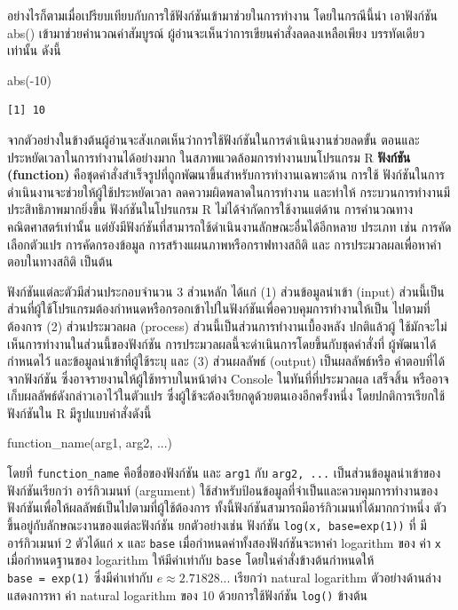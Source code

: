 \documentclass[
  a4paper,
]{book}
\newenvironment{Shaded}{\begin{snugshade}}{\end{snugshade}}
\newcommand{\DecValTok}[1]{\textcolor[rgb]{0.68,0.00,0.00}{#1}}
\newcommand{\FunctionTok}[1]{\textcolor[rgb]{0.28,0.35,0.67}{#1}}
\newcommand{\NormalTok}[1]{\textcolor[rgb]{0.00,0.23,0.31}{#1}}
\newcommand{\SpecialCharTok}[1]{\textcolor[rgb]{0.37,0.37,0.37}{#1}}
\begin{document}
อย่างไรก็ตามเมื่อเปรียบเทียบกับการใช้ฟังก์ชันเข้ามาช่วยในการทำงาน โดยในกรณีนี้นำ
เอาฟังก์ชัน abs() เข้ามาช่วยคำนวณค่าสัมบูรณ์ ผู้อ่านจะเห็นว่าการเขียนคำสั่งลดลงเหลือเพียง
บรรทัดเดียวเท่านั้น ดังนี้

\begin{Shaded}
\begin{Highlighting}[]
\FunctionTok{abs}\NormalTok{(}\SpecialCharTok{{-}}\DecValTok{10}\NormalTok{)}
\end{Highlighting}
\end{Shaded}

\begin{verbatim}
[1] 10
\end{verbatim}

จากตัวอย่างในข้างต้นผู้อ่านจะสังเกตเห็นว่าการใช้ฟังก์ชันในการดำเนินงานช่วยลดขั้น
ตอนและประหยัดเวลาในการทำงานได้อย่างมาก ในสภาพแวดล้อมการทำงานบนโปรแกรม R
\textbf{ฟังก์ชัน (function)} คือชุดคำสั่งสำเร็จรูปที่ถูกพัฒนาขึ้นสำหรับการทำงานเฉพาะด้าน
การใช้ ฟังก์ชันในการดำเนินงานจะช่วยให้ผู้ใช้ประหยัดเวลา ลดความผิดพลาดในการทำงาน
และทำให้ กระบวนการทำงานมีประสิทธิภาพมากยิ่งขึ้น ฟังก์ชันในโปรแกรม R
ไม่ได้จำกัดการใช้งานแต่ด้าน การคำนวณทางคณิตศาสตร์เท่านั้น
แต่ยังมีฟังก์ชันที่สามารถใช้ดำเนินงานลักษณะอื่นได้อีกหลาย ประเภท เช่น การคัดเลือกตัวแปร
การคัดกรองข้อมูล การสร้างแผนภาพหรือกราฟทางสถิติ และ
การประมวลผลเพื่อหาคำตอบในทางสถิติ เป็นต้น

ฟังก์ชันแต่ละตัวมีส่วนประกอบจำนวน 3 ส่วนหลัก ได้แก่ (1) ส่วนข้อมูลนำเข้า (input)
ส่วนนี้เป็นส่วนที่ผู้ใช้โปรแกรมต้องกำหนดหรือกรอกเข้าไปในฟังก์ชันเพื่อควบคุมการทำงานให้เป็น
ไปตามที่ต้องการ (2) ส่วนประมวลผล (process) ส่วนนี้เป็นส่วนการทำงานเบื้องหลัง ปกติแล้วผู้
ใช้มักจะไม่เห็นการทำงานในส่วนนี้ของฟังก์ชัน การประมวลผลนี้จะดำเนินการโดยขึ้นกับชุดคำสั่งที่
ผู้พัฒนาได้กำหนดไว้ และข้อมูลนำเข้าที่ผู้ใช้ระบุ และ (3) ส่วนผลลัพธ์ (output) เป็นผลลัพธ์หรือ
คำตอบที่ได้จากฟังก์ชัน ซึ่งอาจรายงานให้ผู้ใช้ทราบในหน้าต่าง Console ในทันที่ที่ประมวลผล
เสร็จสิ้น หรืออาจเก็บผลลัพธ์ดังกล่าวเอาไว้ในตัวแปร ซึ่งผู้ใช้จะต้องเรียกดูด้วยตนเองอีกครั้งหนึ่ง
โดยปกติการเรียกใช้ฟังก์ชันใน R มีรูปแบบคำสั่งดังนี้

\begin{Shaded}
\begin{Highlighting}[]
\FunctionTok{function\_name}\NormalTok{(arg1, arg2, ...)}
\end{Highlighting}
\end{Shaded}

โดยที่ \texttt{function\_name} คือชื่อของฟังก์ชัน และ \texttt{arg1} กับ
\texttt{arg2,\ ...} เป็นส่วนข้อมูลนำเข้าของ ฟังก์ชันเรียกว่า อาร์กิวเมนท์ (argument)
ใช้สำหรับป้อนข้อมูลที่จำเป็นและควบคุมการทำงานของ
ฟังก์ชันเพื่อให้ผลลัพธ์เป็นไปตามที่ผู้ใช้ต้องการ ทั้งนี้ฟังก์ชันสามารถมีอาร์กิวเมนท์ได้มากกว่าหนึ่ง
ตัวขึ้นอยู่กับลักษณะงานของแต่ละฟังก์ชัน ยกตัวอย่างเช่น ฟังก์ชัน
\texttt{log(x,\ base=exp(1))} ที่ มีอาร์กิวเมนท์ 2 ตัวได้แก่ \texttt{x} และ
\texttt{base} เมื่อกำหนดค่าทั้งสองฟังก์ชันจะหาค่า logarithm ของ ค่า \texttt{x}
เมื่อกำหนดฐานของ logarithm ให้มีค่าเท่ากับ \texttt{base} โดยในคำสั่งข้างต้นกำหนดให้
\texttt{base\ =\ exp(1)} ซึ่งมีค่าเท่ากับ \(e \approx 2.71828...\) เรียกว่า
natural logarithm ตัวอย่างด้านล่าง แสดงการหา ค่า natural logarithm ของ 10
ด้วยการใช้ฟังก์ชัน \texttt{log()} ข้างต้น
\end{document}
